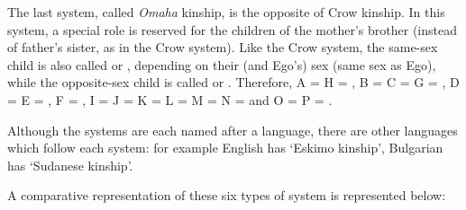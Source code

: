 \begin{refsection}
The last system, called \emph{Omaha} kinship, is the opposite of Crow kinship. In this system, a special role is reserved for the children of the mother's brother (instead of father's sister, as in the Crow system). Like the Crow system, the same-sex child is also called  or , depending on their (and Ego's) sex (same sex as Ego), while the opposite-sex child is called  or . Therefore, A = H = , B = C = G = , D = E = , F = , I = J = K = L = M = N =  and O = P = .

Although the systems are each named after a language, there are other languages which follow each system: for example English has `Eskimo kinship', Bulgarian has `Sudanese kinship'.

A comparative representation of these six types of system is represented below:


\end{refsection}
